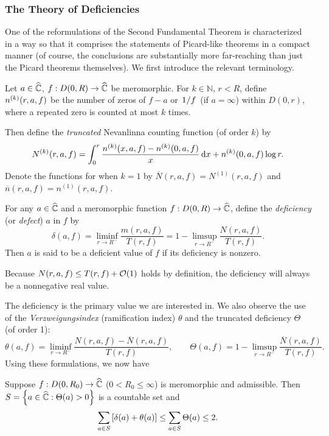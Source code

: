 \subsubsection{The Theory of Deficiencies}\label{sec:deficiencyrelation}
One of the reformulations of the Second Fundamental Theorem is characterized in a way so that it comprises the statements of Picard-like theorems in a compact manner (of course, the conclusions are substantially more far-reaching than just the Picard theorems themselves). We first introduce the relevant terminology.
\begin{definition}
    Let \(a\in\widehat{\mathbb{C}}\), \(f:D(0,R)\to\widehat{\mathbb{C}}\) be meromorphic. For \(k\in\mathbb{N}\), \(r<R\), define \(n^{(k)}\qty(r,a,f)\) be the number of zeros of \(f-a\) or \(\flatfrac1f\) (if \(a=\infty\)) within \(D(0,r)\), where a repeated zero is counted at most \(k\) times.

    Then define the \textit{truncated} Nevanlinna counting function (of order \(k\)) by \[N^{(k)}(r,a,f)=\int_0^r\frac{n^{(k)}(x,a,f)-n^{(k)}(0,a,f)}x\dd{x}+n^{(k)}(0,a,f)\log r.\]
    Denote the functions for when \(k=1\) by \(\overline{N}(r,a,f)=N^{(1)}(r,a,f)\) and \(\overline{n}(r,a,f)=n^{(1)}(r,a,f)\).
\end{definition}
\begin{definition}
    For any \(a\in\widehat{\mathbb{C}}\) and a meromorphic function \(f:D(0,R)\to\widehat{\mathbb{C}}\), define the \textit{deficiency} (or \textit{defect}) \(a\) in \(f\) by \[\delta(a,f)=\liminf_{r\to R^-}\frac{m(r,a,f)}{T(r,f)}=1-\limsup_{r\to R^-}\frac{N(r,a,f)}{T(r,f)}.\]
    Then \(a\) is said to be a deficient value of \(f\) if its deficiency is nonzero.
\end{definition}
\begin{remark}
    Because \(N(r,a,f)\leq T(r,f)+\order{1}\) holds by definition, the deficiency will always be a nonnegative real value.
\end{remark}
The deficiency is the primary value we are interested in. We also observe the use of the \textit{Verzweigungsindex} (ramification index) \(\theta\) and the truncated deficiency \(\Theta\) (of order 1): \[\theta(a,f)=\liminf_{r\to R^-}\frac{N(r,a,f)-\overline{N}(r,a,f)}{T(r,f)},\qquad\Theta(a,f)=1-\limsup_{r\to R^-}\frac{\overline{N}(r,a,f)}{T(r,f)}.\]
Using these formulations, we now have
\begin{theorem}\label{thm:deficiencyrelation}
    Suppose \(f:D\qty(0,R_0)\to\widehat{\mathbb{C}}\) (\(0<R_0\leq\infty\)) is meromorphic and admissible. Then \(S=\cbraces{a\in\extcomplex}{\Theta(a)>0}\) is a countable set and \[\sum_{a\in S}\qty[\delta(a)+\theta(a)]\leq\sum_{a\in S}\Theta(a)\leq 2.\]
\end{theorem}
